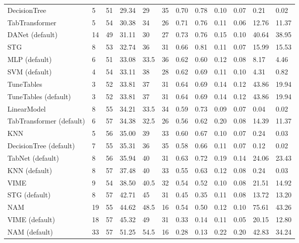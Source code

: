 \begin{tabular}{lllllrllllll}
DecisionTree & 5 & 51 & 29.34 & 29 & 35 & 0.70 & 0.78 & 0.10 & 0.07 & 0.21 & 0.02 \\
TabTransformer & 5 & 54 & 30.38 & 34 & 26 & 0.71 & 0.76 & 0.11 & 0.06 & 12.76 & 11.37 \\
DANet (default) & 14 & 49 & 31.11 & 30 & 27 & 0.73 & 0.76 & 0.15 & 0.10 & 40.64 & 38.95 \\
STG & 8 & 53 & 32.74 & 36 & 31 & 0.66 & 0.81 & 0.11 & 0.07 & 15.99 & 15.53 \\
MLP (default) & 6 & 51 & 33.08 & 33.5 & 36 & 0.62 & 0.60 & 0.12 & 0.08 & 8.17 & 4.46 \\
SVM (default) & 4 & 54 & 33.11 & 38 & 28 & 0.62 & 0.69 & 0.11 & 0.10 & 4.31 & 0.82 \\
TuneTables & 3 & 52 & 33.81 & 37 & 31 & 0.64 & 0.69 & 0.14 & 0.12 & 43.86 & 19.94 \\
TuneTables (default) & 3 & 52 & 33.81 & 37 & 31 & 0.64 & 0.69 & 0.14 & 0.12 & 43.86 & 19.94 \\
LinearModel & 8 & 55 & 34.21 & 33.5 & 34 & 0.59 & 0.73 & 0.09 & 0.07 & 0.04 & 0.02 \\
TabTransformer (default) & 6 & 57 & 34.38 & 32.5 & 26 & 0.56 & 0.62 & 0.20 & 0.08 & 14.39 & 11.37 \\
KNN & 5 & 56 & 35.00 & 39 & 33 & 0.60 & 0.67 & 0.10 & 0.07 & 0.24 & 0.03 \\
DecisionTree (default) & 7 & 55 & 35.31 & 36 & 35 & 0.58 & 0.66 & 0.11 & 0.07 & 0.12 & 0.02 \\
TabNet (default) & 8 & 56 & 35.94 & 40 & 31 & 0.63 & 0.72 & 0.19 & 0.14 & 24.06 & 23.43 \\
KNN (default) & 8 & 57 & 37.48 & 40 & 33 & 0.55 & 0.63 & 0.12 & 0.08 & 0.24 & 0.03 \\
VIME & 9 & 54 & 38.50 & 40.5 & 32 & 0.54 & 0.52 & 0.10 & 0.08 & 21.51 & 14.92 \\
STG (default) & 8 & 57 & 42.71 & 45 & 31 & 0.45 & 0.35 & 0.11 & 0.08 & 13.72 & 13.20 \\
NAM & 19 & 55 & 44.62 & 48.5 & 16 & 0.54 & 0.50 & 0.12 & 0.10 & 75.61 & 43.26 \\
VIME (default) & 18 & 57 & 45.32 & 49 & 31 & 0.33 & 0.14 & 0.11 & 0.05 & 20.15 & 12.80 \\
NAM (default) & 33 & 57 & 51.25 & 54.5 & 16 & 0.28 & 0.13 & 0.22 & 0.20 & 42.83 & 34.24 \\
\bottomrule
\end{tabular}
